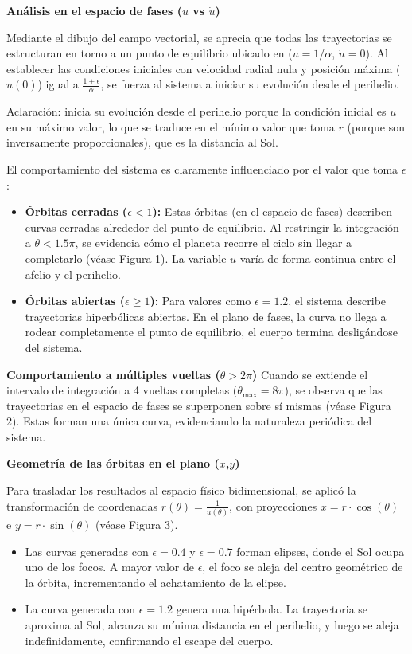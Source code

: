 \documentclass[]{report}
\begin{document}
\textbf{Análisis en el espacio de fases ($u$ vs $\dot{u}$)}

Mediante el dibujo del campo vectorial, se aprecia que todas las trayectorias se estructuran en torno a un punto de equilibrio ubicado en ($u = 1/\alpha$, $\dot{u} = 0$).
Al establecer las condiciones iniciales con velocidad radial nula y posición máxima ($u(0)$) igual a $\frac{1 + \epsilon}{\alpha}$, se fuerza al sistema a iniciar su evolución desde el perihelio.

Aclaración: inicia su evolución desde el perihelio porque la condición inicial es $u$ en su máximo valor, lo que se traduce en el mínimo valor que toma $r$ (porque son inversamente proporcionales), que es la distancia al Sol.

El comportamiento del sistema es claramente influenciado por el valor que toma $\epsilon$:

\begin{itemize}
\item \textbf{Órbitas cerradas ($\epsilon < 1$):} 
Estas órbitas (en el espacio de fases) describen curvas cerradas alrededor del punto de equilibrio. 
Al restringir la integración a $\theta < 1.5\pi$, se evidencia cómo el planeta recorre el ciclo sin llegar a completarlo (véase Figura 1).
La variable $u$ varía de forma continua entre el afelio y el perihelio.

\item \textbf{Órbitas abiertas ($\epsilon \geq 1$):} 
Para valores como $\epsilon = 1.2$, el sistema describe trayectorias hiperbólicas abiertas. 
En el plano de fases, la curva no llega a rodear completamente el punto de equilibrio, el cuerpo termina desligándose del sistema.
\end{itemize}

\textbf{Comportamiento a múltiples vueltas ($\theta > 2\pi$)}
Cuando se extiende el intervalo de integración a 4 vueltas completas ($\theta_{\max} = 8\pi$), se observa que las trayectorias en el espacio de fases se superponen sobre sí mismas (véase Figura 2).
Estas forman una única curva, evidenciando la naturaleza periódica del sistema.

\textbf{Geometría de las órbitas en el plano ($x$,$y$)}

Para trasladar los resultados al espacio físico bidimensional, se aplicó la transformación de coordenadas $r(\theta) = \frac{1}{u(\theta)}$, con proyecciones $x = r \cdot \cos(\theta)$ e $y = r \cdot \sin(\theta)$ (véase Figura 3).

\begin{itemize}
	\item Las curvas generadas con $\epsilon = 0.4$ y $\epsilon = 0.7$ forman elipses, donde el Sol ocupa uno de los focos. A mayor valor de $\epsilon$, el foco se aleja del centro geométrico de la órbita, incrementando el achatamiento de la elipse.
	\item La curva generada con $\epsilon = 1.2$ genera una hipérbola. La trayectoria se aproxima al Sol, alcanza su mínima distancia en el perihelio, y luego se aleja indefinidamente, confirmando el escape del cuerpo.
\end{itemize}
\end{document}
